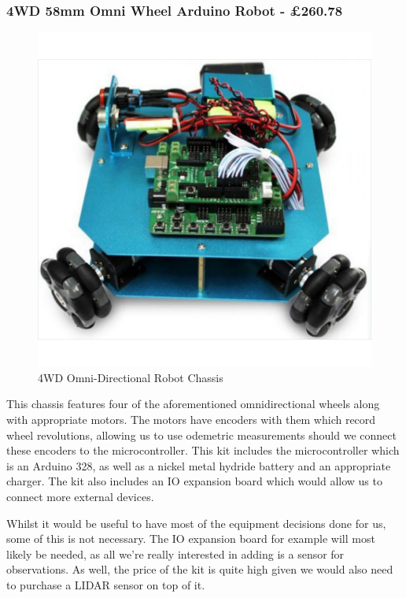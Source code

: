					\subsubsection{4WD 58mm Omni Wheel Arduino Robot - \pounds{260.78}}
					\begin{figure}[h]
						\centering
						\includegraphics[width=.3\linewidth]{ANALYSIS/4wdomnidirectionalarduino.jpg}
						\caption{4WD Omni-Directional Robot Chassis}
						\label{4WD Omni-Directional Robot Chassis}
					\end{figure}
					This chassis features four of the aforementioned omnidirectional wheels along with appropriate motors. The motors have encoders with them which record wheel revolutions, allowing us to use odemetric measurements should we connect these encoders to the microcontroller. This kit includes the microcontroller which is an Arduino 328, as well as a nickel metal hydride battery and an appropriate charger. The kit also includes an IO expansion board which would allow us to connect more external devices. 
					
					Whilst it would be useful to have most of the equipment decisions done for us, some of this is not necessary. The IO expansion board for example will most likely be needed, as all we're really interested in adding is a sensor for observations. As well, the price of the kit is quite high given we would also need to purchase a LIDAR sensor on top of it.
					
